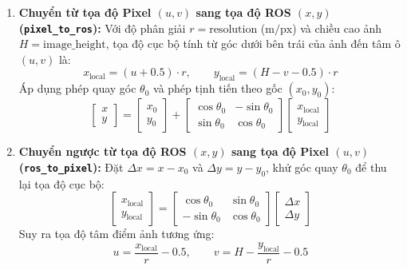 \begin{enumerate}[leftmargin=1.2cm]
  \item \textbf{Chuyển từ tọa độ Pixel $(u, v)$ sang tọa độ ROS $(x, y)$ (\texttt{pixel\_to\_ros}):}
  Với độ phân giải $r = \text{resolution}$ ($\text{m/px}$) và chiều cao ảnh $H = \text{image\_height}$, tọa độ cục bộ tính từ góc dưới bên trái của ảnh đến tâm ô $(u, v)$ là:
  \begin{equation}
    x_{\text{local}} = (u + 0.5) \cdot r, \qquad y_{\text{local}} = (H - v - 0.5) \cdot r
  \end{equation}
  Áp dụng phép quay góc $\theta_0$ và phép tịnh tiến theo gốc $(x_0, y_0)$:
  \begin{equation}
    \begin{bmatrix} x \\ y \end{bmatrix} =
    \begin{bmatrix} x_0 \\ y_0 \end{bmatrix} +
    \begin{bmatrix} \cos\theta_0 & -\sin\theta_0 \\ \sin\theta_0 & \cos\theta_0 \end{bmatrix}
    \begin{bmatrix} x_{\text{local}} \\ y_{\text{local}} \end{bmatrix}
  \end{equation}

  \item \textbf{Chuyển ngược từ tọa độ ROS $(x, y)$ sang tọa độ Pixel $(u, v)$ (\texttt{ros\_to\_pixel}):}
  Đặt $\Delta x = x - x_0$ và $\Delta y = y - y_0$, khử góc quay $\theta_0$ để thu lại tọa độ cục bộ:
  \begin{equation}
    \begin{bmatrix} x_{\text{local}} \\ y_{\text{local}} \end{bmatrix} =
    \begin{bmatrix} \cos\theta_0 & \sin\theta_0 \\ -\sin\theta_0 & \cos\theta_0 \end{bmatrix}
    \begin{bmatrix} \Delta x \\ \Delta y \end{bmatrix}
  \end{equation}
  Suy ra tọa độ tâm điểm ảnh tương ứng:
  \begin{equation}
    u = \frac{x_{\text{local}}}{r} - 0.5, \qquad v = H - \frac{y_{\text{local}}}{r} - 0.5
  \end{equation}
\end{enumerate}


